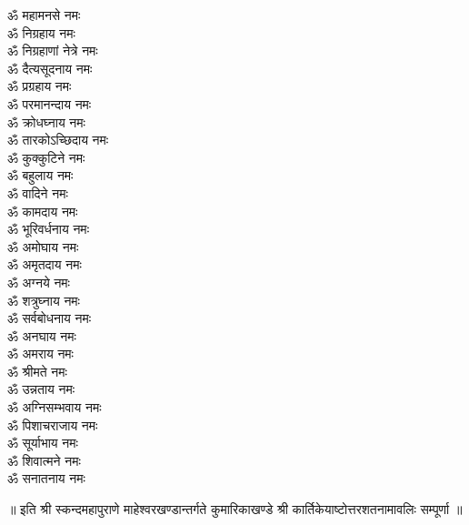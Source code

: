 \begin{multicols}{2}
\begin{flushleft}
ॐ महामनसे नमः\\
ॐ निग्रहाय नमः\\
ॐ निग्रहाणां नेत्रे नमः\\
ॐ दैत्यसूदनाय नमः\\
ॐ प्रग्रहाय नमः\\
ॐ परमानन्दाय नमः\\
ॐ क्रोधघ्नाय नमः\\
ॐ तारकोऽच्छिदाय नमः\\
ॐ कुक्कुटिने नमः\hfill{}\\
ॐ बहुलाय नमः\\
ॐ वादिने नमः\\
ॐ कामदाय नमः\\
ॐ भूरिवर्धनाय नमः\\
ॐ अमोघाय नमः\\
ॐ अमृतदाय नमः\\
ॐ अग्नये नमः\\
ॐ शत्रुघ्नाय नमः\\
ॐ सर्वबोधनाय नमः\\
ॐ अनघाय नमः\hfill{}\\
ॐ अमराय नमः\\
ॐ श्रीमते नमः\\
ॐ उन्नताय नमः\\
ॐ अग्निसम्भवाय नमः\\
ॐ पिशाचराजाय नमः\\
ॐ सूर्याभाय नमः\\
ॐ शिवात्मने नमः\\
ॐ सनातनाय नमः\\
\end{flushleft}
\end{multicols}
\centerline{॥ इति श्री स्कन्दमहापुराणे माहेश्वरखण्डान्तर्गते कुमारिकाखण्डे श्री कार्तिकेयाष्टोत्तरशतनामावलिः सम्पूर्णा ॥}
